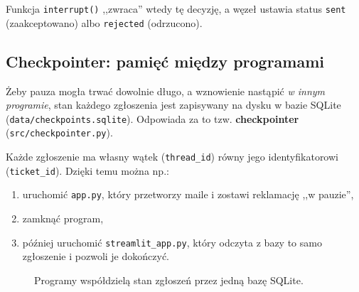 \documentclass[11pt,a4paper]{article}
\newcommand{\plik}[1]{\texttt{#1}}
\begin{document}
Funkcja \texttt{interrupt()} ,,zwraca'' wtedy tę decyzję, a węzeł ustawia
status \texttt{sent} (zaakceptowano) albo \texttt{rejected} (odrzucono).

\subsection{Checkpointer: pamięć między programami}

Żeby pauza mogła trwać dowolnie długo, a wznowienie nastąpić \emph{w innym
programie}, stan każdego zgłoszenia jest zapisywany na dysku w bazie SQLite
(\plik{data/checkpoints.sqlite}). Odpowiada za to tzw. \textbf{checkpointer}
(\plik{src/checkpointer.py}).

Każde zgłoszenie ma własny wątek (\texttt{thread\_id}) równy jego
identyfikatorowi (\texttt{ticket\_id}). Dzięki temu można np.:

\begin{enumerate}
  \item uruchomić \plik{app.py}, który przetworzy maile i zostawi reklamację
        ,,w pauzie'',
  \item zamknąć program,
  \item później uruchomić \plik{streamlit\_app.py}, który odczyta z bazy to
        samo zgłoszenie i pozwoli je dokończyć.
\end{enumerate}

\begin{figure}[ht]
\centering
{}
\caption{Programy współdzielą stan zgłoszeń przez jedną bazę SQLite.}
\end{figure}

\end{document}
